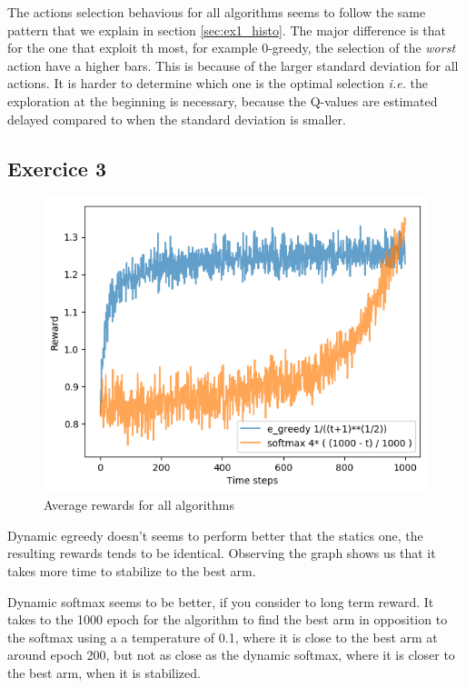\documentclass[letterpaper]{article}
\begin{document}
The actions selection behavious for all algorithms seems to follow
the same pattern that we explain in section \ref{sec:ex1_histo}.
The major difference is that for the one that exploit th most, for example
$0$-greedy, the selection of the \textit{worst} action have a higher
bars. This is because of the larger standard deviation for all actions.
It is harder to determine which one is the optimal selection \textit{i.e.}
the exploration at the beginning is necessary, because the Q-values
are estimated delayed compared to when the standard deviation is smaller.

\subsection{Exercice 3}

\begin{figure}[H]
    \centering
    \includegraphics[width=.7\linewidth]{images/assign3/ex3/rewards}
    \caption{Average rewards for all algorithms}
    \label{fig:rewards_ex3}
\end{figure}

Dynamic egreedy doesn't seems to perform better that the statics one,
the resulting rewards tends to be identical. Observing the graph shows
us that it takes more time to stabilize to the best arm.

Dynamic softmax seems to be better, if you consider to long term reward.
It takes to the 1000 epoch for the algorithm to find the best arm in
opposition to the softmax using a a temperature of 0.1, where it
is close to the best arm at around epoch 200, but not as close as
the dynamic softmax, where it is closer to the best arm, when it
is stabilized.
\end{document}
